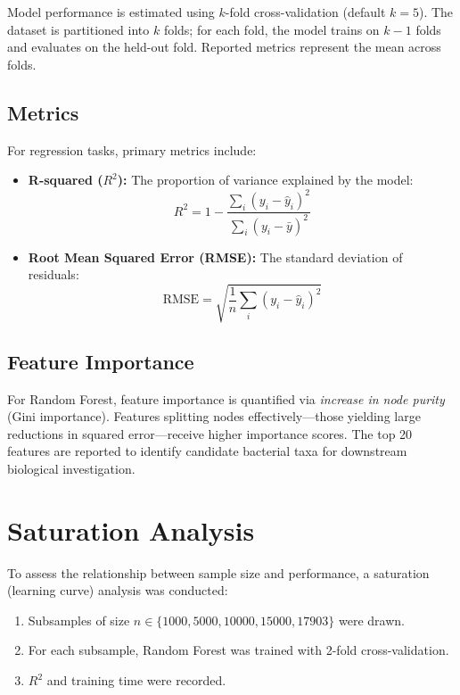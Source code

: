 Model performance is estimated using $k$-fold cross-validation (default $k=5$). The dataset is partitioned into $k$ folds; for each fold, the model trains on $k-1$ folds and evaluates on the held-out fold. Reported metrics represent the mean across folds.

\subsection{Metrics}

For regression tasks, primary metrics include:

\begin{itemize}
    \item \textbf{R-squared ($R^2$):} The proportion of variance explained by the model:
    \begin{equation}
    R^2 = 1 - \frac{\sum_i (y_i - \hat{y}_i)^2}{\sum_i (y_i - \bar{y})^2}
    \end{equation}
    \item \textbf{Root Mean Squared Error (RMSE):} The standard deviation of residuals:
    \begin{equation}
    \text{RMSE} = \sqrt{\frac{1}{n} \sum_i (y_i - \hat{y}_i)^2}
    \end{equation}
\end{itemize}

\subsection{Feature Importance}

For Random Forest, feature importance is quantified via \emph{increase in node purity} (Gini importance). Features splitting nodes effectively---those yielding large reductions in squared error---receive higher importance scores. The top 20 features are reported to identify candidate bacterial taxa for downstream biological investigation.

\section{Saturation Analysis}

To assess the relationship between sample size and performance, a saturation (learning curve) analysis was conducted:

\begin{enumerate}
    \item Subsamples of size $n \in \{1000, 5000, 10000, 15000, 17903\}$ were drawn.
    \item For each subsample, Random Forest was trained with 2-fold cross-validation.
    \item $R^2$ and training time were recorded.
\end{enumerate}

